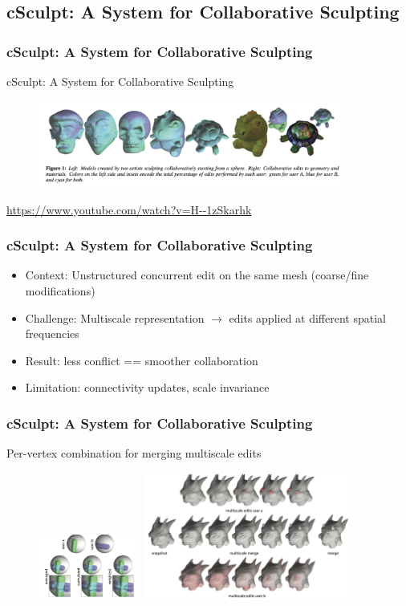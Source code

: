 \subsection{cSculpt: A System for Collaborative Sculpting}
\frame
{
	\frametitle{cSculpt: A System for Collaborative Sculpting}
	cSculpt: A System for Collaborative Sculpting \cite{Calabrese:2016}
	
	\begin{figure}
		\centering
		\includegraphics[width=0.9\textwidth]{img/csculpt/summ2.png}
	\end{figure}
	\centering
	\url{https://www.youtube.com/watch?v=H--1zSkarhk}
}
\frame
{
	\frametitle{cSculpt: A System for Collaborative Sculpting}
	\begin{itemize}[<+->]
		\item Context: Unstructured concurrent edit on the same mesh (coarse/fine modifications)
		
		\item Challenge: Multiscale representation $\rightarrow$ edits applied at different spatial frequencies
		
		\item Result: less conflict  == smoother collaboration
		\item Limitation: connectivity updates, scale invariance
	\end{itemize}
}
\frame
{
	\frametitle{cSculpt: A System for Collaborative Sculpting}
	Per-vertex combination for merging multiscale edits
	\begin{figure}
		\centering
		\includegraphics[width=0.3\textwidth]{img/csculpt/combi.png}
		\includegraphics[width=0.6\textwidth]{img/csculpt/merge.png}
	\end{figure}
}
